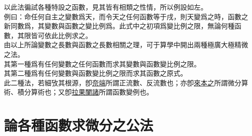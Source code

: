 \begin{enumerate} [label={第\chinese*款}]
    以此法徧試各種特設之函數，見其皆有相類之性情，所以例設如左。\\
    例曰：命任何自主之變數爲天，而令天之任何函數等于戌，則天變爲\CJKmove 之時，函數之新同數爲\CJKmove，其變數與函數之變比例爲\CJKmove。此式中之初項\CJKmove 爲變比例之限，無論何種函數，其限皆可依此比例求之。\\
    由以上所論變數之長數與函數之長數相關之理，可于算學中開出兩種極廣大極精微之法。\\
    其第一種爲有任何變數之任何函數而求其變數與函數變比例之限。\\
    其第二種爲有任何變數與函數變比例之限而求其函數之原式。\\
    此二種法，若細攷其根源，卽\uline{奈端}所謂正流數、反流數也；亦卽\uline{來本之}所謂微分算術、積分算術也；又卽\uline{拉果闌諸}所謂函數變例也。
\end{enumerate}

\section{論各種函數求微分之公法}

